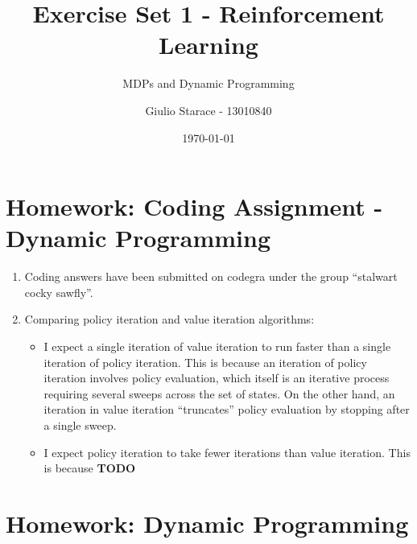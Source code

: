 \documentclass[
]{article}
\title{Exercise Set 1 - Reinforcement Learning}
\subtitle{MDPs and Dynamic Programming}
\author{Giulio Starace - 13010840}
\date{\today}
\providecommand{\tightlist}{%
  \setlength{\itemsep}{0pt}\setlength{\parskip}{0pt}}
\begin{document}
\maketitle

\hypertarget{homework-coding-assignment---dynamic-programming}{%
\section{Homework: Coding Assignment - Dynamic
Programming}\label{homework-coding-assignment---dynamic-programming}}

\begin{enumerate}
\def\labelenumi{\arabic{enumi}.}
\tightlist
\item
  Coding answers have been submitted on codegra under the group
  ``stalwart cocky sawfly''.
\item
  Comparing policy iteration and value iteration algorithms:

  \begin{itemize}
  \tightlist
  \item
    I expect a single iteration of value iteration to run faster than a
    single iteration of policy iteration. This is because an iteration
    of policy iteration involves policy evaluation, which itself is an
    iterative process requiring several sweeps across the set of states.
    On the other hand, an iteration in value iteration ``truncates''
    policy evaluation by stopping after a single sweep.
  \item
    I expect policy iteration to take fewer iterations than value
    iteration. This is because \textbf{TODO}
  \end{itemize}
\end{enumerate}

\hypertarget{homework-dynamic-programming}{%
\section{Homework: Dynamic
Programming}\label{homework-dynamic-programming}}
\end{document}
